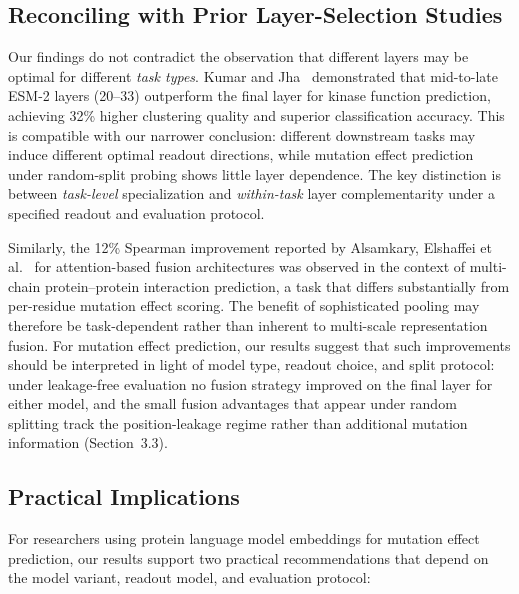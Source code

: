 \documentclass[numbered,webpdf,modern,large]{oup-authoring-template}
\begin{document}
\subsection{Reconciling with Prior Layer-Selection Studies}

Our findings do not contradict the observation that different layers may be
optimal for different \emph{task types}. Kumar and Jha~\cite{kumar2025}
demonstrated that mid-to-late ESM-2 layers (20--33) outperform the final layer
for kinase function prediction, achieving 32\% higher clustering quality and
superior classification accuracy. This is compatible with our narrower conclusion:
different downstream tasks may induce different optimal readout directions, while
mutation effect prediction under random-split probing shows little layer dependence.
The key distinction is between \emph{task-level} specialization and
\emph{within-task} layer complementarity under a specified readout and evaluation
protocol.

Similarly, the 12\% Spearman improvement reported by Alsamkary, Elshaffei
et al.~\cite{elshaffei2025} for attention-based fusion architectures was
observed in the context of multi-chain protein--protein interaction prediction,
a task that differs substantially from per-residue mutation effect scoring.
The benefit of sophisticated pooling may therefore be task-dependent rather than
inherent to multi-scale representation fusion. For mutation effect prediction,
our results suggest that such improvements should be interpreted in light of
model type, readout choice, and split protocol: under leakage-free evaluation
no fusion strategy improved on the final layer for either model, and the
small fusion advantages that appear under random splitting track the
position-leakage regime rather than additional mutation information
(Section~3.3).

\subsection{Practical Implications}

For researchers using protein language model embeddings for mutation effect
prediction, our results support two practical recommendations that depend on
the model variant, readout model, and evaluation protocol:
\end{document}
